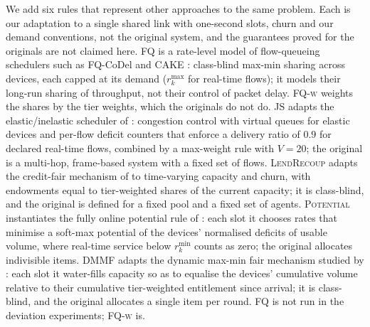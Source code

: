 \documentclass[preprint,11pt]{elsarticle}
\theoremstyle{definition}
\theoremstyle{remark}
\newcommand{\rmin}{r^{\min}}
\newcommand{\rmax}{r^{\max}}
\begin{document}
We add six rules that represent other approaches to the same problem. Each is our adaptation to a single shared link with one-second slots, churn and our demand conventions, not the original system, and the guarantees proved for the originals are not claimed here.
\textsc{FQ} is a rate-level model of flow-queueing schedulers such as FQ-CoDel \citep{rfc8290} and CAKE \citep{hoiland2018cake}: class-blind max-min sharing across devices, each capped at its demand ($\rmax_k$ for real-time flows); it models their long-run sharing of throughput, not their control of packet delay. \textsc{FQ-w} weights the shares by the tier weights, which the originals do not do.
\textsc{JS} adapts the elastic/inelastic scheduler of \citet{jaramillo2011elastic}: congestion control with virtual queues for elastic devices and per-flow deficit counters that enforce a delivery ratio of $0.9$ for declared real-time flows, combined by a max-weight rule with $V=20$; the original is a multi-hop, frame-based system with a fixed set of flows.
\textsc{LendRecoup} adapts the credit-fair mechanism of \citet{zahedi2026credit} to time-varying capacity and churn, with endowments equal to tier-weighted shares of the current capacity; it is class-blind, and the original is defined for a fixed pool and a fixed set of agents.
\textsc{Potential} instantiates the fully online potential rule of \citet{kahana2026perpetual}: each slot it chooses rates that minimise a soft-max potential of the devices' normalised deficits of usable volume, where real-time service below $\rmin_k$ counts as zero; the original allocates indivisible items.
\textsc{DMMF} adapts the dynamic max-min fair mechanism studied by \citet{fikioris2025dmmf}: each slot it water-fills capacity so as to equalise the devices' cumulative volume relative to their cumulative tier-weighted entitlement since arrival; it is class-blind, and the original allocates a single item per round.
\textsc{FQ} is not run in the deviation experiments; \textsc{FQ-w} is.
\end{document}
